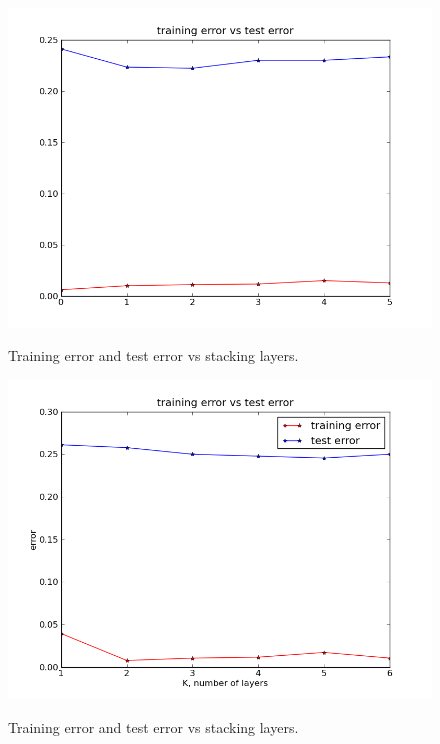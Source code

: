 \documentclass[a4paper,11pt]{article}
\begin{document}
\begin{figure}[!ht]
  \caption{Training error and test error vs stacking layers.}
  \centering
  \includegraphics[width=4.5in]{WU5/trainingvstestD3R.png}
  \label{figures:f1}
\end{figure}

\newpage

\begin{figure}[!ht]
  \caption{Training error and test error vs stacking layers.}
  \centering
  \includegraphics[width=4.5in]{WU5/trainingvstestD2R.png}
  \label{figures:f2}
\end{figure}
\end{document}

